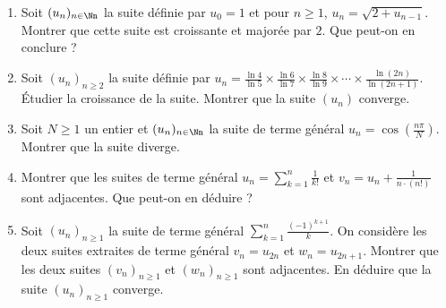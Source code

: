 \begin{frame}
 \begin{miniexercice}	
\begin{enumerate}
  \item Soit $(u_n)_{n\in \Nn}$ la suite définie par $u_0=1$ et pour $n\geq 1$, 
$u_n=\sqrt{2+u_{n-1}}$. Montrer que cette suite est croissante et majorée par $2$. 
Que peut-on en conclure ?

  \item Soit $(u_n)_{n \ge 2}$ la suite définie par 
  $u_n =\frac{\ln 4}{\ln 5}\times \frac{\ln 6}{\ln 7}\times\frac{\ln 8}{\ln 9}\times 
  \cdots \times\frac{\ln (2n)}{\ln (2n+1)}.$  \'Etudier la croissance de la suite.
  Montrer que la suite $(u_n)$ converge.
  
  \item Soit $N\geq 1$ un entier et $(u_n)_{n\in \Nn}$ la suite de terme général 
$u_n=\cos(\frac{n\pi}{N})$. Montrer que la suite diverge. 
  
  \item Montrer que les suites de terme général $u_n=\sum_{k=1}^n \frac{1}{k!}$ et 
$v_n=u_n+\frac{1}{n \cdot (n!)}$ sont adjacentes. Que peut-on en déduire ? 

   \item Soit $(u_n)_{n\geq 1}$ la suite de terme général $\sum_{k=1}^{n}\frac{(-1)^{k+1}}{k}$. 
On considère les deux suites extraites de terme général $v_n=u_{2n}$ et $w_n= u_{2n+1}$. 
Montrer que les deux suites $(v_n)_{n\geq 1}$ et $(w_n)_{n\geq 1}$ sont adjacentes. 
En déduire que la suite $(u_n)_{n\geq 1}$ converge.

\end{enumerate}

 \end{miniexercice}

 \end{frame}



